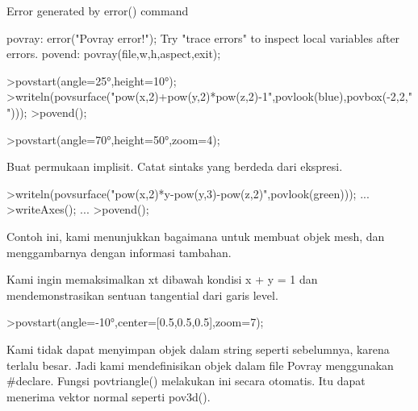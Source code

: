 \documentclass[a4paper,10pt]{article}
\begin{document}
\begin{eulernotebook}
\begin{euleroutput}
  Error generated by error() command
  
  povray:
      error("Povray error!");
  Try "trace errors" to inspect local variables after errors.
  povend:
      povray(file,w,h,aspect,exit); 
\end{euleroutput}
\begin{eulerprompt}
>povstart(angle=25°,height=10°); 
>writeln(povsurface("pow(x,2)+pow(y,2)*pow(z,2)-1",povlook(blue),povbox(-2,2,"")));
>povend();
\end{eulerprompt}
\begin{eulerprompt}
>povstart(angle=70°,height=50°,zoom=4);
\end{eulerprompt}
\begin{eulercomment}
Buat permukaan implisit. Catat sintaks yang berdeda dari ekspresi.
\end{eulercomment}
\begin{eulerprompt}
>writeln(povsurface("pow(x,2)*y-pow(y,3)-pow(z,2)",povlook(green))); ...
>writeAxes(); ...
>povend();
\end{eulerprompt}
\begin{eulercomment}
Contoh ini, kami menunjukkan bagaimana untuk membuat objek mesh, dan
menggambarnya dengan informasi tambahan.

Kami ingin memaksimalkan xt dibawah kondisi x + y = 1 dan
mendemonstrasikan sentuan tangential dari garis level.
\end{eulercomment}
\begin{eulerprompt}
>povstart(angle=-10°,center=[0.5,0.5,0.5],zoom=7);
\end{eulerprompt}
\begin{eulercomment}
Kami tidak dapat menyimpan objek dalam string seperti sebelumnya,
karena terlalu besar. Jadi kami mendefinisikan objek dalam file Povray
menggunakan #declare. Fungsi povtriangle() melakukan ini secara
otomatis. Itu dapat menerima vektor normal seperti pov3d().


\end{eulercomment}
\end{eulernotebook}
\end{document}
